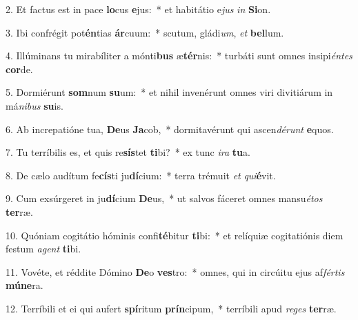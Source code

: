 2. Et factus est in pace \textbf{lo}cus \textbf{e}jus:~*  et habitátio e\textit{jus} \textit{in} \textbf{Si}on.\

3. Ibi confrégit pot\textbf{én}tias \textbf{ár}cuum:~*  scutum, gládi\textit{um}, \textit{et} \textbf{bel}lum.\

4. Illúminans tu mirabíliter a mónti\textbf{bus} æ\textbf{tér}nis:~*  turbáti sunt omnes insipi\textit{én}\textit{tes} \textbf{cor}de.\

5. Dormiérunt \textbf{som}num \textbf{su}um:~*  et nihil invenérunt omnes viri divitiárum in má\textit{ni}\textit{bus} \textbf{su}is.\

6. Ab increpatióne tua, \textbf{De}us \textbf{Ja}cob,~*  dormitavérunt qui ascen\textit{dé}\textit{runt} \textbf{e}quos.\

7. Tu terríbilis es, et quis re\textbf{sís}tet \textbf{ti}bi?~*  ex tunc \textit{i}\textit{ra} \textbf{tu}a.\

8. De cælo audítum fe\textbf{cís}ti ju\textbf{dí}cium:~*  terra trémuit \textit{et} \textit{qui}\textbf{é}vit.\

9. Cum exsúrgeret in ju\textbf{dí}cium \textbf{De}us,~*  ut salvos fáceret omnes mansu\textit{é}\textit{tos} \textbf{ter}ræ.\

10. Quóniam cogitátio hóminis confi\textbf{té}bitur \textbf{ti}bi:~*  et relíquiæ cogitatiónis diem festum \textit{a}\textit{gent} \textbf{ti}bi.\

11. Vovéte, et réddite Dómino \textbf{De}o \textbf{ves}tro:~*  omnes, qui in circúitu ejus af\textit{fér}\textit{tis} \textbf{mú}\textbf{ne}ra.\

12. Terríbili et ei qui aufert \textbf{spí}ritum \textbf{prín}cipum,~*  terríbili apud \textit{re}\textit{ges} \textbf{ter}ræ.\

